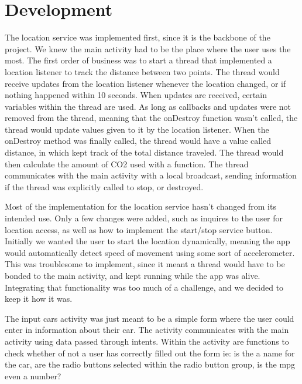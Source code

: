 \documentclass[twoside,twocolumn]{article}
\begin{document}


\section{Development}

The location service was implemented first, since it is the backbone of the project. We knew the main activity had to be the place where the user uses the most. The first order of business was to start a thread that implemented a location listener to track the distance between two points. The thread would receive updates from the location listener whenever the location changed, or if nothing happened within 10 seconds. When updates are received, certain variables within the thread are used. As long as callbacks and updates were not removed from the thread, meaning that the onDestroy function wasn't called, the thread would update values given to it by the location listener. When the onDestroy method was finally called, the thread would have a value called distance, in which kept track of the total distance traveled. The thread would then calculate the amount of CO2 used with a function. The thread communicates with the main activity with a local broadcast, sending information if the thread was explicitly called to stop, or destroyed.

Most of the implementation for the location service hasn't changed from its intended use. Only a few changes were added, such as inquires to the user for location access, as well as how to implement the start/stop service button. Initially we wanted the user to start the location dynamically, meaning the app would automatically detect speed of movement using some sort of accelerometer. This was troublesome to implement, since it meant a thread would have to be bonded to the main activity, and kept running while the app was alive. Integrating that functionality was too much of a challenge, and we decided to keep it how it was.

The input cars activity was just meant to be a simple form where the user could enter in information about their car. The activity communicates with the main activity using data passed through intents. Within the activity are functions to check whether of not a user has correctly filled out the form ie: is the a name for the car, are the radio buttons selected within the radio button group, is the mpg even a number?
\end{document}
